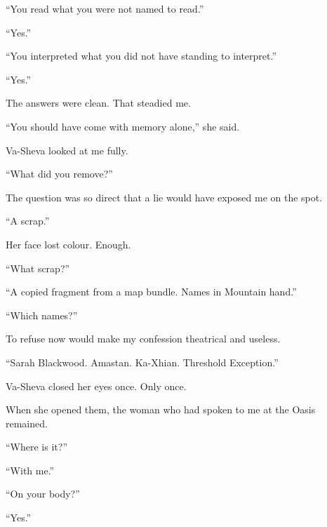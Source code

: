 ``You read what you were not named to read.''\par

``Yes.''\par

``You interpreted what you did not have standing to interpret.''\par

``Yes.''\par

The answers were clean. That steadied me.\par

``You should have come with memory alone,'' she said.\par

Va-Sheva looked at me fully.\par

``What did you remove?''\par

The question was so direct that a lie would have exposed me on the spot.\par

``A scrap.''\par

Her face lost colour. Enough.\par

``What scrap?''\par

``A copied fragment from a map bundle. Names in Mountain hand.''\par

``Which names?''\par

To refuse now would make my confession theatrical and useless.\par

``Sarah Blackwood. Amastan. Ka-Xhian. Threshold Exception.''\par

Va-Sheva closed her eyes once. Only once.\par

When she opened them, the woman who had spoken to me at the Oasis remained.\par

``Where is it?''\par

``With me.''\par

``On your body?''\par

``Yes.''\par

